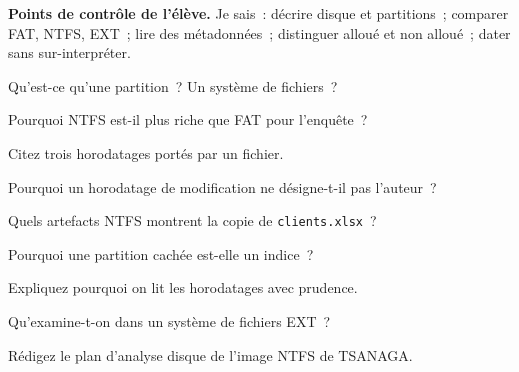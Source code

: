 \begin{boxinfo}
\textbf{Points de contrôle de l'élève.} Je sais~: décrire disque et
partitions~; comparer FAT, NTFS, EXT~; lire des métadonnées~; distinguer
alloué et non alloué~; dater sans sur-interpréter.
\end{boxinfo}

\bigskip

\begin{boxexo}[title={\ding{45}\quad Exercice~10.1. Partition \niveaubase}]
Qu'est-ce qu'une partition~? Un système de fichiers~?
\end{boxexo}

\begin{boxexo}[title={\ding{45}\quad Exercice~10.2. NTFS \niveaubase}]
Pourquoi NTFS est-il plus riche que FAT pour l'enquête~?
\end{boxexo}

\begin{boxexo}[title={\ding{45}\quad Exercice~10.3. Métadonnées \niveaubase}]
Citez trois horodatages portés par un fichier.
\end{boxexo}

\begin{boxexo}[title={\ding{45}\quad Exercice~10.4. La date et l'auteur \niveaumoyen}]
Pourquoi un horodatage de modification ne désigne-t-il pas l'auteur~?
\end{boxexo}

\begin{boxexo}[title={\ding{45}\quad Exercice~10.5. TSANAGA \niveaumoyen}]
Quels artefacts NTFS montrent la copie de \texttt{clients.xlsx}~?
\end{boxexo}

\begin{boxexo}[title={\ding{45}\quad Exercice~10.6. Partition cachée \niveaumoyen}]
Pourquoi une partition cachée est-elle un indice~?
\end{boxexo}

\begin{boxexo}[title={\ding{45}\quad Exercice~10.7. CRO \niveaumoyen}]
Expliquez pourquoi on lit les horodatages avec prudence.
\end{boxexo}

\begin{boxexo}[title={\ding{45}\quad Exercice~10.8. EXT \niveaumoyen}]
Qu'examine-t-on dans un système de fichiers EXT~?
\end{boxexo}

\begin{boxexo}[title={\ding{45}\quad Exercice~10.9. Plan d'analyse \niveauexpert}]
Rédigez le plan d'analyse disque de l'image NTFS de TSANAGA.
\end{boxexo}

